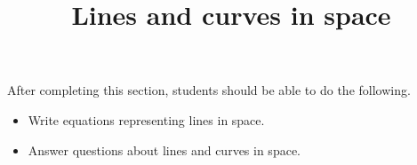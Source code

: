 \documentclass{ximera}
\title{Lines and curves in space}
\begin{document}
\begin{abstract}
\end{abstract}

\maketitle

\begin{sectionOutcomes}

After completing this section, students should be able to do the following.

\begin{itemize}
\item Write equations representing lines in space. 
\item Answer questions about lines and curves in space.
\end{itemize}

\end{sectionOutcomes}
\end{document}

